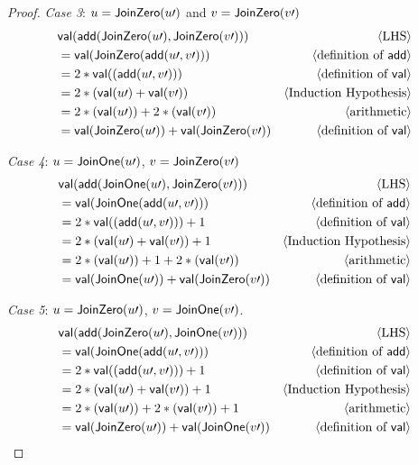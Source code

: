 \documentclass[11pt,fleqn]{article}
\newcommand{\mname}[1]{\mbox{\sf #1}}
\newcommand{\pnote}[1]{{\langle \text{#1} \rangle}}
\begin{document}
\begin{proof}
\emph{Case 3}: $u = \mname{JoinZero}(u\prime)$ and $v = \mname{JoinZero}(v\prime)$
\begin{align*}
  &\mname{val}(\mname{add}(\mname{JoinZero}(u\prime),\mname{JoinZero}(v\prime))) & \pnote{LHS}\\
  &= \mname{val}(\mname{JoinZero}(\mname{add}(u\prime,v\prime)))  & \pnote{definition of \mname{add}}\\
  &= 2 * \mname{val}((\mname{add}(u\prime,v\prime)))  & \pnote{definition of \mname{val}}\\
  &= 2 * ( \mname{val}(u\prime)+\mname{val}(v\prime)) & \pnote{Induction Hypothesis}\\
  &= 2 * ( \mname{val}(u\prime)) + 2 * ( \mname{val}(v\prime)) & \pnote{arithmetic}\\
  &=  \mname{val}(\mname{JoinZero}(u\prime)) + \mname{val}(\mname{JoinZero}(v\prime)) 
  & \pnote{definition of \mname{val}}\\
\end{align*}

\emph{Case 4}: $u =\mname{JoinOne}(u\prime)$, $v =\mname{JoinZero}(v\prime)$
\begin{align*}
  &\mname{val}(\mname{add}(\mname{JoinOne}(u\prime),\mname{JoinZero}(v\prime))) & \pnote{LHS}\\
  &= \mname{val}(\mname{JoinOne}(\mname{add}(u\prime,v\prime)))  & \pnote{definition of \mname{add}}\\
  &= 2 * \mname{val}((\mname{add}(u\prime,v\prime))) + 1  & \pnote{definition of \mname{val}}\\
  &= 2 * ( \mname{val}(u\prime)+\mname{val}(v\prime)) + 1 & \pnote{Induction Hypothesis}\\
  &= 2 * ( \mname{val}(u\prime)) + 1 + 2 * ( \mname{val}(v\prime)) & \pnote{arithmetic}\\
  &=  \mname{val}(\mname{JoinOne}(u\prime)) + \mname{val}(\mname{JoinZero}(v\prime)) 
  & \pnote{definition of \mname{val}}\\
\end{align*}

\emph{Case 5}: $u =\mname{JoinZero}(u\prime)$, $v =\mname{JoinOne}(v\prime)$. 
\begin{align*}
  &\mname{val}(\mname{add}(\mname{JoinZero}(u\prime),\mname{JoinOne}(v\prime))) & \pnote{LHS}\\
  &= \mname{val}(\mname{JoinOne}(\mname{add}(u\prime,v\prime)))  & \pnote{definition of \mname{add}}\\
  &= 2 * \mname{val}((\mname{add}(u\prime,v\prime))) + 1  & \pnote{definition of \mname{val}}\\
  &= 2 * ( \mname{val}(u\prime)+\mname{val}(v\prime)) + 1 & \pnote{Induction Hypothesis}\\
  &= 2 * ( \mname{val}(u\prime)) + 2 * ( \mname{val}(v\prime)) + 1 & \pnote{arithmetic}\\
  &=  \mname{val}(\mname{JoinZero}(u\prime)) + \mname{val}(\mname{JoinOne}(v\prime)) 
  & \pnote{definition of \mname{val}}\\
\end{align*}



\end{proof}
\end{document}
